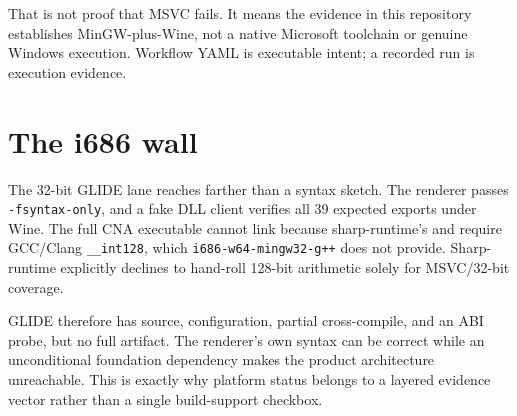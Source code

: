 That is not proof that MSVC fails. It means the evidence in this repository establishes
MinGW-plus-Wine, not a native Microsoft toolchain or genuine Windows execution. Workflow YAML
is executable intent; a recorded run is execution evidence.

\section{The i686 wall}

The 32-bit GLIDE lane reaches farther than a syntax sketch. The renderer passes
\texttt{-fsyntax-only}, and a fake DLL client verifies all 39 expected exports under Wine. The
full CNA executable cannot link because sharp-runtime's  and
 require GCC/Clang \texttt{\_\_int128}, which
\texttt{i686-w64-mingw32-g++} does not provide. Sharp-runtime explicitly declines to hand-roll
128-bit arithmetic solely for MSVC/32-bit coverage.

GLIDE therefore has source, configuration, partial cross-compile, and an ABI probe, but no full
artifact. The renderer's own syntax can be correct while an unconditional foundation dependency
makes the product architecture unreachable. This is exactly why platform status belongs to a
layered evidence vector rather than a single build-support checkbox.
